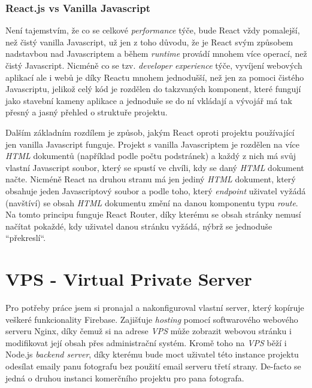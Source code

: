 \documentclass[12pt,a4paper]{report}
\begin{document}
  \subsection{React.js vs Vanilla Javascript}
  Není tajemstvím, že co se celkové \emph{performance} týče, bude React vždy pomalejší, než čistý vanilla Javascript, už jen 
  z toho důvodu, že je React svým způsobem nadstavbou nad Javascriptem a během \emph{runtime} provádí mnohem více operací, než čistý Javascript.
  Nicméně co se tzv. \emph{developer experience} týče, vyvíjení webových aplikací ale i webů je díky Reactu mnohem jednodušší, než jen
  za pomoci čistého Javascriptu, jelikož celý kód je rozdělen do takzvaných komponent, které fungují jako stavební kameny aplikace a jednoduše se 
  do ní vkládají a vývojář má tak přesný a jasný přehled o struktuře projektu. 

  Dalším základním rozdílem je způsob, jakým React oproti projektu používající jen vanilla Javascript funguje.
  Projekt s vanilla Javascriptem je rozdělen na více \emph{HTML} dokumentů (například podle počtu podstránek) a každý z nich má svůj vlastní 
  Javascript soubor, který se spustí ve chvíli, kdy se daný \emph{HTML} dokument načte.
  Nicméně React na druhou stranu má jen jediný \emph{HTML} dokument, který obsahuje jeden Javascriptový soubor a podle toho,
  který \emph{endpoint} uživatel vyžádá (navštíví) se obsah \emph{HTML} dokumentu změní na danou komponentu typu \emph{route}.
  Na tomto principu funguje React Router, díky kterému se obsah stránky nemusí načítat pokaždé, kdy uživatel danou stránku vyžádá,
  nýbrž se jednoduše ``překreslí``.
 
  \chapter{VPS - Virtual Private Server}
   Pro potřeby práce jsem si pronajal a nakonfiguroval vlastní server, který kopíruje veškeré funkcionality
   Firebase. Zajišťuje \emph{hosting} pomocí softwarového webového serveru Nginx, díky čemuž si na adrese \emph{VPS} může
   zobrazit webovou stránku i modifikovat její obsah přes administrační systém. Kromě toho na \emph{VPS} běží i Node.js \emph{backend server},
   díky kterému bude moct uživatel této instance projektu odesílat emaily panu fotografu bez použití email serveru třetí strany. 
   De-facto se jedná o druhou instanci komerčního projektu pro pana fotografa. 
\end{document}
